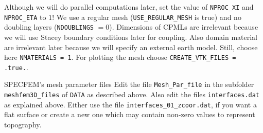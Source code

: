 Although we will do parallel computations later, set the value of \verb+NPROC_XI+ and \verb+NPROC_ETA+ to $1$! We use a regular mesh (\verb+USE_REGULAR_MESH+ is true) and no doubling layers (\verb+NDOUBLINGS+ $=0$). Dimensions of CPMLs are irrelevant because we will use Stacey boundary conditions later for coupling. Also domain material are irrelevant later because we will specify an external earth model. Still, choose here \verb+NMATERIALS = 1+. For plotting the mesh choose \verb+CREATE_VTK_FILES = .true.+.
%
\begin{actionbox}[label={action:mesh_parfile},float=h!]{SPECFEM's mesh parameter files}
	Edit the file \verb+Mesh_Par_file+ in the subfolder \verb+meshfem3D_files+ of \verb+DATA+ as described above. Also edit the files \verb+interfaces.dat+ as explained above. Either use the file \verb+interfaces_01_zcoor.dat+, if you want a flat surface or create a new one which may contain non-zero values to represent topography.
\end{actionbox}
%
